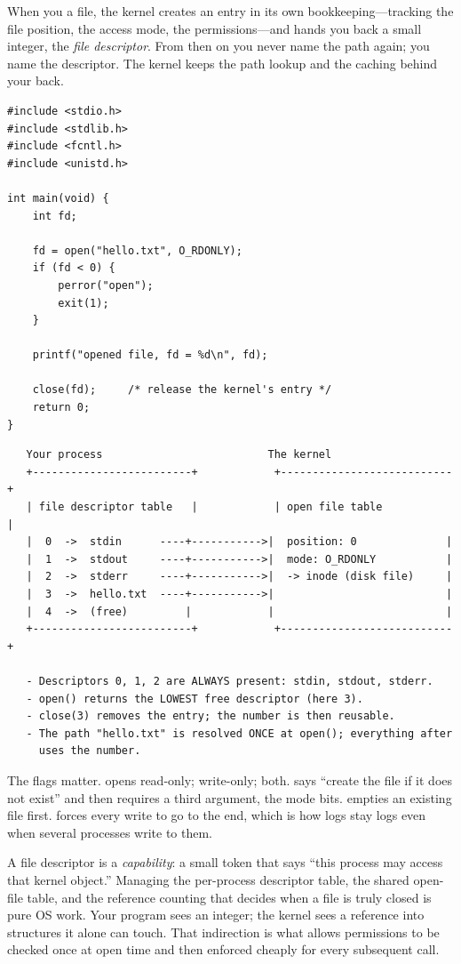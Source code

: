 When you  a file, the kernel creates an entry in its own
bookkeeping---tracking the file position, the access mode, the
permissions---and hands you back a small integer, the \emph{file
descriptor}. From then on you never name the path again; you name the
descriptor. The kernel keeps the path lookup and the caching behind
your back.

\begin{lstlisting}[caption={Opening a file for reading.}]
#include <stdio.h>
#include <stdlib.h>
#include <fcntl.h>
#include <unistd.h>

int main(void) {
    int fd;

    fd = open("hello.txt", O_RDONLY);
    if (fd < 0) {
        perror("open");
        exit(1);
    }

    printf("opened file, fd = %d\n", fd);

    close(fd);     /* release the kernel's entry */
    return 0;
}
\end{lstlisting}

\begin{verbatim}
   Your process                          The kernel
   +-------------------------+            +---------------------------+
   | file descriptor table   |            | open file table           |
   |  0  ->  stdin      ----+----------->|  position: 0              |
   |  1  ->  stdout     ----+----------->|  mode: O_RDONLY           |
   |  2  ->  stderr     ----+----------->|  -> inode (disk file)     |
   |  3  ->  hello.txt  ----+----------->|                           |
   |  4  ->  (free)         |            |                           |
   +-------------------------+            +---------------------------+

   - Descriptors 0, 1, 2 are ALWAYS present: stdin, stdout, stderr.
   - open() returns the LOWEST free descriptor (here 3).
   - close(3) removes the entry; the number is then reusable.
   - The path "hello.txt" is resolved ONCE at open(); everything after
     uses the number.
\end{verbatim}

The flags matter.  opens read-only; 
write-only;  both.  says ``create the file
if it does not exist'' and then requires a third argument, the mode
bits.  empties an existing file first. 
forces every write to go to the end, which is how logs stay logs even
when several processes write to them.

\begin{osconcept}
A file descriptor is a \emph{capability}: a small token that says
``this process may access that kernel object.'' Managing the per-process
descriptor table, the shared open-file table, and the reference
counting that decides when a file is truly closed is pure OS work.
Your program sees an integer; the kernel sees a reference into
structures it alone can touch. That indirection is what allows
permissions to be checked once at open time and then enforced cheaply
for every subsequent call.
\end{osconcept}

